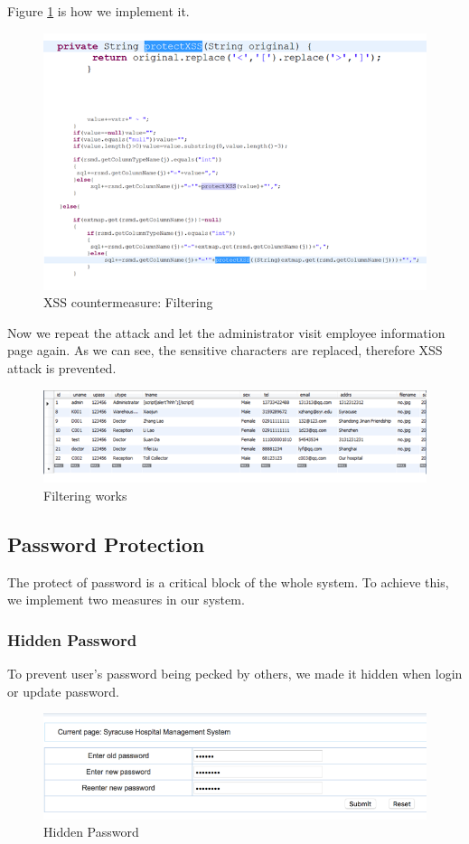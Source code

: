 Figure \ref{fig:s14} is how we implement it.
\begin{figure}[H]
    \centering
    \includegraphics[width=\textwidth]{sp/sp14.png}
    \caption{XSS countermeasure: Filtering}
    \label{fig:s14}
\end{figure}
 
Now we repeat the attack and let the administrator visit employee information page again. As we can see, the sensitive characters are replaced, therefore XSS attack is prevented.
\begin{figure}[H]
    \centering
    \includegraphics[width=\textwidth]{sp/sp15.png}
    \caption{Filtering works}
    \label{fig:s15}
\end{figure}

\subsection{Password Protection}
The protect of password is a critical block of the whole system. To achieve this, we implement two measures in our system.

\subsubsection{Hidden Password}
To prevent user’s password being pecked by others, we made it hidden when login or update password.
\begin{figure}[H]
    \centering
    \includegraphics[width=\textwidth]{sp/sp01.PNG}
    \caption{Hidden Password}
    \label{fig:s01}
\end{figure}


